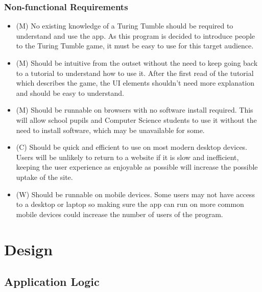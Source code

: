 \documentclass{l4proj}
\begin{document}
\subsection{Non-functional Requirements}
\begin{itemize}
    \item (M) No existing knowledge of a Turing Tumble should be required to understand and use the app. As this program is decided to introduce people to the Turing Tumble game, it must be easy to use for this target audience.
    \item (M) Should be intuitive from the outset without the need to keep going back to a tutorial to understand how to use it. After the first read of the tutorial which describes the game, the UI elements shouldn't need more explanation and should be easy to understand.
    \item (M) Should be runnable on browsers with no software install required. This will allow school pupils and Computer Science students to use it without the need to install software, which may be unavailable for some.
    \item (C) Should be quick and efficient to use on most modern desktop devices. Users will be unlikely to return to a website if it is slow and inefficient, keeping the user experience as enjoyable as possible will increase the possible uptake of the site.
    \item (W) Should be runnable on mobile devices. Some users may not have access to a desktop or laptop so making sure the app can run on more common mobile devices could increase the number of users of the program.
\end{itemize}

\chapter{Design}
\section{Application Logic}
\end{document}
